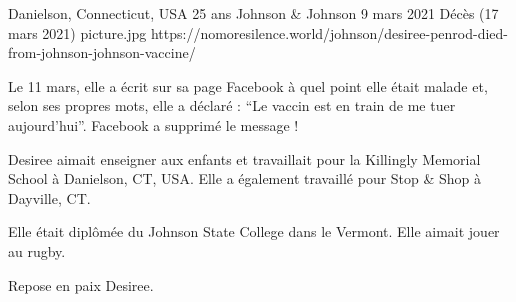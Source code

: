 {Danielson, Connecticut, USA}
{25 ans}
{Johnson \& Johnson}
{9 mars 2021}
{Décès (17 mars 2021)}
{picture.jpg}
{https://nomoresilence.world/johnson/desiree-penrod-died-from-johnson-johnson-vaccine/}
{

Le 11 mars, elle a écrit sur sa page Facebook à quel point elle était malade et,
selon ses propres mots, elle a déclaré : “Le vaccin est en train de me tuer
aujourd'hui”. Facebook a supprimé le message !

Desiree aimait enseigner aux enfants et travaillait pour la Killingly Memorial
School à Danielson, CT, USA. Elle a également travaillé pour Stop \& Shop à
Dayville, CT.

Elle était diplômée du Johnson State College dans le Vermont. Elle aimait jouer
au rugby.

Repose en paix Desiree.

}
